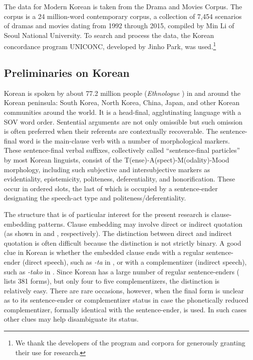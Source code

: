 \documentclass[output=paper,colorlinks,citecolor=brown]{langscibook}
\begin{document}
The data for Modern Korean is taken from the Drama and Movies Corpus. The corpus is a 24 million-word contemporary corpus, a collection of 7,454 scenarios of dramas and movies dating from 1992 through 2015, compiled by Min Li of Seoul National University. To search and process the data, the Korean concordance program UNICONC, developed by Jinho Park, was used.\footnote{We thank the developers of the program and corpora for generously granting their use for research.}


\subsection{Preliminaries on Korean}
\label{subsec:preliminaries}

Korean is spoken by about 77.2 million people (\textit{Ethnologue} \citealt{SimonsFennig2018}) in and around the Korean peninsula: South Korea, North Korea, China, Japan, and other Korean communities around the world. It is a head-final, agglutinating language with a SOV word order. Sentential arguments are not only omissible but such omission is often preferred when their referents are contextually recoverable. The sentence-final word is the main-clause verb with a number of morphological markers. These sentence-final verbal suffixes, collectively called ``sentence-final particles'' by most Korean linguists, consist of the T(ense)-A(spect)-M(odality)-Mood morphology, including such subjective and intersubjective markers as evidentiality, epistemicity, politeness, deferentiality, and honorification. These occur in ordered slots, the last of which is occupied by a sentence-ender designating the speech-act type and politeness/deferentiality.

The structure that is of particular interest for the present research is clause-embedding patterns. Clause embedding may involve direct or indirect quotation (as shown in  and , respectively). The distinction between direct and indirect quotation is often difficult because the distinction is not strictly binary. A good clue in Korean is whether the embedded clause ends with a regular sentence-ender (direct speech), such as \textit{-ta} in , or with a complementizer (indirect speech), such as \textit{-tako} in . Since Korean has a large number of regular sentence-enders (\citealt[147--151]{Kim2001} lists 381 forms), but only four to five complementizers, the distinction is relatively easy. There are rare occasions, however, when the final form is unclear as to its sentence-ender or complementizer status in case the phonetically reduced complementizer, formally identical with the sentence-ender, is used. In such cases other clues may help disambiguate its status.
\end{document}
